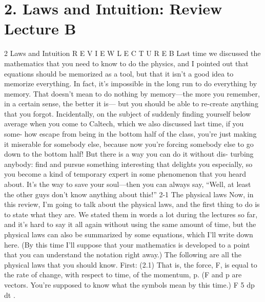 \documentclass[10pt,oneside]{article}
\begin{document}
\clearpage
{}
\section*{2. Laws and Intuition: Review Lecture B}
\label{tips-sec-10-2-laws-and-intuition-review-lecture-b}
2 Laws and Intuition R E V I E W  L E C T U R E  B Last time we discussed the mathematics that you need to know to do the physics, and I pointed out that equations should be memorized as a tool, but that it isn’t a good idea to memorize everything. In fact, it’s impossible in the long run to do everything by memory. That doesn’t mean to do nothing by memory---the more you remember, in a certain sense, the better it is--- but you should be able to re-create anything that you forgot. Incidentally, on the subject of suddenly finding yourself below average when you come to Caltech, which we also discussed last time, if you some- how escape from being in the bottom half of the class, you’re just making it miserable for somebody else, because now you’re forcing somebody else to go down to the bottom half! But there is a way you can do it without dis- turbing anybody: find and pursue something interesting that delights you especially, so you become a kind of temporary expert in some phenomenon that you heard about. It’s the way to save your soul---then you can always say, “Well, at least the other guys don’t know anything about this!” 2-1 The physical laws Now, in this review, I’m going to talk about the physical laws, and the first thing to do is to state what they are. We stated them in words a lot during the lectures so far, and it’s hard to say it all again without using the same amount of time, but the physical laws can also be summarized by some equations, which I’ll write down here. (By this time I’ll suppose that your mathematics is developed to a point that you can understand the notation right away.) The following are all the physical laws that you should know. First: (2.1) That is, the force, F, is equal to the rate of change, with respect to time, of the momentum, p. (F and p are vectors. You’re supposed to know what the symbols mean by this time.) F 5 dp dt .\par
\end{document}

